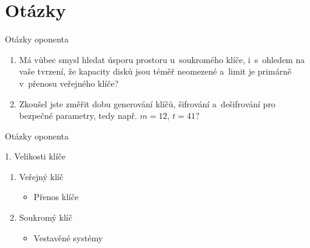 \documentclass{beamer}
\begin{document}
\section{Otázky}
\begin{frame}{Otázky oponenta}
    \begin{enumerate}

        \item Má vůbec smysl hledat úsporu prostoru u~soukromého klíče,
            i~s~ohledem na vaše tvrzení, že kapacity disků jsou téměř neomezené
            a~limit je primárně v~přenosu veřejného klíče?

        \item Zkoušel jste změřit dobu generování klíčů, šifrování a~dešifrování
            pro bezpečné parametry, tedy např. $m=12$, $t=41$?

    \end{enumerate}
\end{frame}

\begin{frame}{Otázky oponenta}

    \begin{block}{1. Velikosti klíče}
        \begin{enumerate}

            \item Veřejný klíč
                \begin{itemize}
                    \item Přenos klíče
                \end{itemize}

            \item Soukromý klíč
                \begin{itemize}
                    \item Vestavěné systémy
                \end{itemize}

        \end{enumerate}
    \end{block}

\end{frame}
\end{document}
